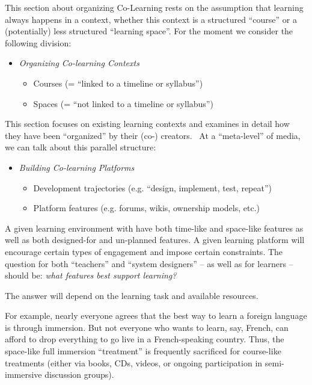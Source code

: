 This section about organizing Co-Learning rests on the assumption that
learning always happens in a context, whether this context is a
structured ``course'' or a (potentially) less structured ``learning
space''. For the moment we consider the following division:

\begin{itemize}
\itemsep1pt\parskip0pt
\item
  \emph{Organizing Co-learning Contexts}

  \begin{itemize}
  \itemsep1pt\parskip0pt
  \item
    Courses (= ``linked to a timeline or syllabus'')
  \item
    Spaces (= ``not linked to a timeline or syllabus'')
  \end{itemize}
\end{itemize}

This section focuses on existing learning contexts and examines in
detail how they have been ``organized'' by their \mbox{(co-)} \mbox{creators}.~ At a
``meta-level'' of media, we can talk about this parallel structure:

\begin{itemize}
\itemsep1pt\parskip0pt
\item
  \emph{Building Co-learning Platforms}

  \begin{itemize}
  \itemsep1pt\parskip0pt
  \item
    Development trajectories (e.g. ``design, implement, test, repeat'')
  \item
    Platform features (e.g. forums, wikis, ownership models, etc.)
  \end{itemize}
\end{itemize}

A given learning environment with have both time-like and space-like
features as well as both designed-for and un-planned features. A given
learning platform will encourage certain types of engagement and impose
certain constraints. The question for both ``teachers'' and ``system
designers'' -- as well as for learners -- should be: \emph{what features
best support learning?}

The answer will depend on the learning task and available resources.

For example, nearly everyone agrees that the best way to learn a foreign
language is through immersion. But not everyone who wants to learn, say,
French, can afford to drop everything to go live in a French-speaking
country. Thus, the space-like full immersion ``treatment'' is frequently
sacrificed for course-like treatments (either via books, CDs, videos, or
ongoing participation in semi-immersive discussion groups).

